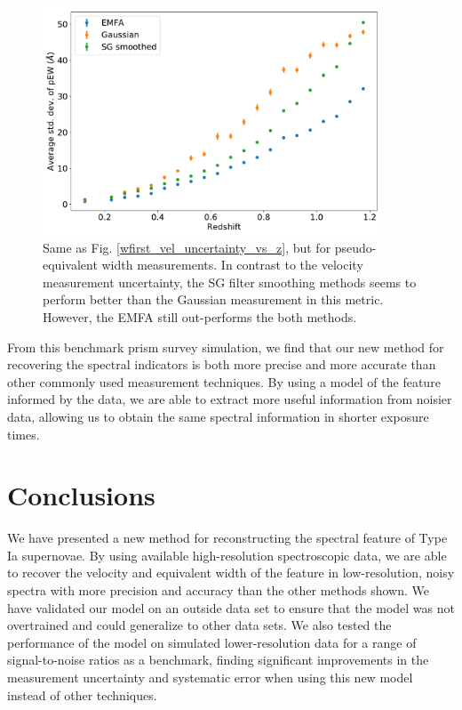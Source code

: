 \begin{figure}[htbp]
    \centering
    \includegraphics[width=0.9\textwidth]{figures/si_feat_pca/wfirst_pew_uncert.pdf}
    \caption{Same as Fig. \ref{wfirst_vel_uncertainty_vs_z}, but for pseudo-equivalent width measurements. In contrast to the velocity measurement uncertainty, the SG filter smoothing methods seems to perform better than the Gaussian measurement in this metric. However, the EMFA still out-performs the both methods.}
    \label{wfirst_ew_uncertainty_vs_z}
\end{figure}

From this benchmark prism survey simulation, we find that our new method for recovering the \siliconii\; spectral indicators is both more precise and more accurate than other commonly used measurement techniques. By using a model of the feature informed by the data, we are able to extract more useful information from noisier data, allowing us to obtain the same spectral information in shorter exposure times. 

\section{Conclusions}
\label{conclusions}
We have presented a new method for reconstructing the \siliconii\; spectral feature of Type Ia supernovae. By using available high-resolution spectroscopic data, we are able to recover the velocity and equivalent width of the feature in low-resolution, noisy spectra with more precision and accuracy than the other methods shown. We have validated our model on an outside data set to ensure that the model was not overtrained and could generalize to other data sets. We also tested the performance of the model on simulated lower-resolution data for a range of signal-to-noise ratios as a benchmark, finding significant improvements in the measurement uncertainty and systematic error when using this new model instead of other techniques.

